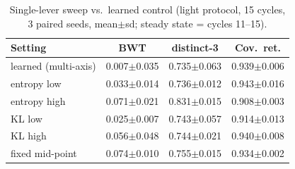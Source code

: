 \begin{table}[t]
\caption{Single-lever sweep vs.\ learned control (light protocol, 15 cycles, 3 paired seeds, mean$\pm$sd; steady state = cycles 11--15).}
\label{tab:sweep}
\centering
\begin{tabular}{@{}lccc@{}}
\toprule
Setting & BWT & distinct-3 & Cov.\ ret. \\
\midrule
learned (multi-axis) & 0.007$\pm$0.035 & 0.735$\pm$0.063 & 0.939$\pm$0.006 \\
entropy low & 0.033$\pm$0.014 & 0.736$\pm$0.012 & 0.943$\pm$0.016 \\
entropy high & 0.071$\pm$0.021 & 0.831$\pm$0.015 & 0.908$\pm$0.003 \\
KL low & 0.025$\pm$0.007 & 0.743$\pm$0.057 & 0.914$\pm$0.013 \\
KL high & 0.056$\pm$0.048 & 0.744$\pm$0.021 & 0.940$\pm$0.008 \\
fixed mid-point & 0.074$\pm$0.010 & 0.755$\pm$0.015 & 0.934$\pm$0.002 \\
\bottomrule
\end{tabular}
\end{table}
